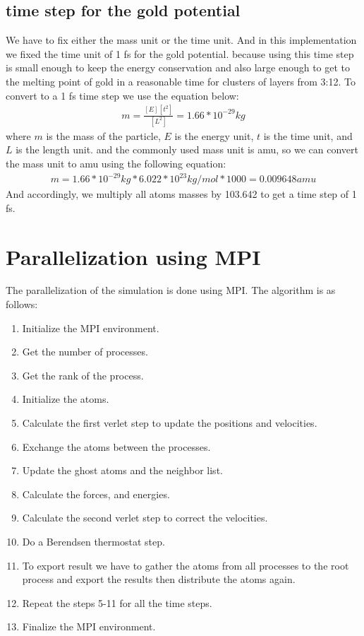     \subsection{time step for the gold potential}
    We have to fix either the mass unit or the time unit. And in this implementation we fixed the time unit of 1 fs for the gold potential. because using this time step is small enough to keep the energy conservation and also large enough to get to the melting point of gold in a reasonable time for clusters of layers from 3:12. To convert to a 1 fs time step we use the equation below: 
    \begin{equation}
    \label{eq:time_step}
        \begin{aligned}
            m = \frac{[E][t^2]}{[L^2]} = 1.66*10^{-29} kg
        \end{aligned}
    \end{equation}
    where $m$ is the mass of the particle, $E$ is the energy unit, $t$ is the time unit, and $L$ is the length unit.
    and the commonly used mass unit is amu, so we can convert the mass unit to amu using the following equation:
    \begin{equation}
    \label{eq:amu}
        \begin{aligned}
            m = 1.66*10^{-29} kg * 6.022*10^{23} kg/mol * 1000 = 0.009648 amu
        \end{aligned}
    \end{equation}
    And accordingly, we multiply all atoms masses by 103.642 to get a time step of 1 fs.


\section{Parallelization using MPI}
The parallelization of the simulation is done using MPI. The algorithm is as follows:
\begin{enumerate}
    \item Initialize the MPI environment.
    \item Get the number of processes.
    \item Get the rank of the process.
    \item Initialize the atoms.
    \item Calculate the first verlet step to update the positions and velocities.
    \item Exchange the atoms between the processes.
    \item Update the ghost atoms and the neighbor list.
    \item Calculate the forces, and energies.

    \item Calculate the second verlet step to correct the velocities.
    \item Do a Berendsen thermostat step.
    \item To export result we have to gather the atoms from all processes to the root process and export the results then distribute the atoms again.
    \item Repeat the steps 5-11 for all the time steps.
    \item Finalize the MPI environment.
\end{enumerate}
